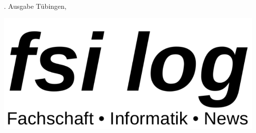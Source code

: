 \thispagestyle{empty}
{\sf \number\auflage. Ausgabe \hfill Tübingen, 
\Month\space \number\jahr}\\
\vspace{5cm}

\includegraphics[width=\textwidth]{logos/fsi-log-logo}


\begin{center}
%
%
%
%
\vfill
\end{center}
\eject